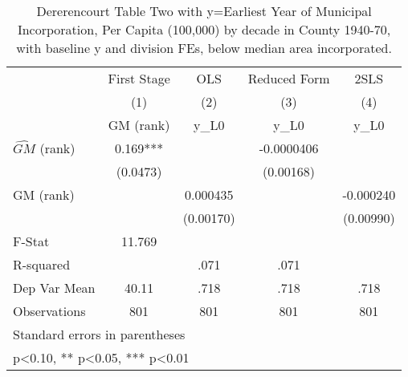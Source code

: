 \begin{table}[htbp]\centering
\def\sym#1{\ifmmode^{#1}\else\(^{#1}\)\fi}
\caption{Dererencourt Table Two with y=Earliest Year of Municipal Incorporation, Per Capita (100,000) by decade in County 1940-70, with baseline y and division FEs, below median area incorporated.}
\begin{tabular}{l*{4}{c}}
\toprule
                    & First Stage   &         OLS   &Reduced Form   &        2SLS   \\
                    &\multicolumn{1}{c}{(1)}&\multicolumn{1}{c}{(2)}&\multicolumn{1}{c}{(3)}&\multicolumn{1}{c}{(4)}\\
                    &\multicolumn{1}{c}{GM  (rank)}&\multicolumn{1}{c}{y\_L0}&\multicolumn{1}{c}{y\_L0}&\multicolumn{1}{c}{y\_L0}\\
\midrule
$\hat{GM}$ (rank)   &       0.169***&               &  -0.0000406   &               \\
                    &    (0.0473)   &               &   (0.00168)   &               \\
\addlinespace
GM  (rank)          &               &    0.000435   &               &   -0.000240   \\
                    &               &   (0.00170)   &               &   (0.00990)   \\
\midrule
F-Stat              &      11.769   &               &               &               \\
R-squared           &               &        .071   &        .071   &               \\
Dep Var Mean        &       40.11   &        .718   &        .718   &        .718   \\
Observations        &         801   &         801   &         801   &         801   \\
\bottomrule
\multicolumn{5}{l}{\footnotesize Standard errors in parentheses}\\
\multicolumn{5}{l}{\footnotesize * p<0.10, ** p<0.05, *** p<0.01}\\
\end{tabular}
\end{table}
